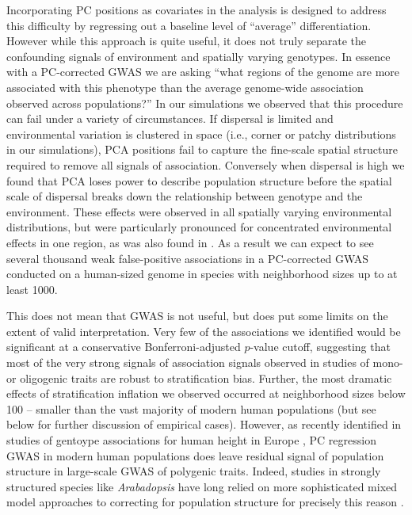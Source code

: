 \documentclass[11pt,twoside,lineno]{preprint}
\begin{document}
Incorporating PC positions as covariates in the analysis \citep{Price2006} is designed to address this difficulty by regressing out a baseline level of ``average'' differentiation. However while this approach is quite useful, it does not truly separate the confounding signals of environment and spatially varying genotypes. In essence with a PC-corrected GWAS we are asking ``what regions of the genome are more associated with this phenotype than the average genome-wide association observed across populations?'' In our simulations we observed that this procedure can fail under a variety of circumstances. If dispersal is limited and environmental variation is clustered in space (i.e., corner or patchy distributions in our simulations), PCA positions fail to capture the fine-scale spatial structure required to remove all signals of association. Conversely when dispersal is high we found that PCA loses power to describe population structure before the spatial scale of dispersal breaks down the relationship between genotype and the environment. These effects were observed in all spatially varying environmental distributions, but were particularly pronounced for concentrated environmental effects in one region, as was also found in \cite{Mathieson2012}. As a result we can expect to see several thousand weak false-positive associations in a PC-corrected GWAS conducted on a human-sized genome in species with neighborhood sizes up to at least 1000. 

This does not mean that GWAS is not useful, but does put some limits on the extent of valid interpretation. Very few of the associations we identified would be significant at a conservative Bonferroni-adjusted $p$-value cutoff, suggesting that most of the very strong signals of association signals observed in studies of mono- or oligogenic traits are robust to stratification bias. Further, the most dramatic effects of stratification inflation we observed occurred at neighborhood sizes below 100 -- smaller than the vast majority of modern human populations (but see below for further discussion of empirical cases). However, as recently identified in studies of gentoype associations for human height in Europe \citep{Berg2018,Sohail2018}, PC regression GWAS in modern human populations does leave residual signal of population structure in large-scale GWAS of polygenic traits. Indeed, studies in strongly structured species like \textit{Arabadopsis} have long relied on more sophisticated mixed model approaches to correcting for population structure for precisely this reason \citep{Aranzana2005,Sasaki2015}.
\end{document}
